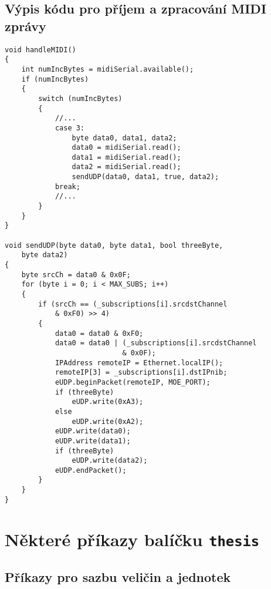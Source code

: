 \section{Výpis kódu pro příjem a zpracování \acs{MIDI} zprávy}\label{code:handleMIDI}
\begin{lstlisting}[caption=Výpis kódu pro příjem a zpracování MIDI zprávy]
void handleMIDI()
{
	int numIncBytes = midiSerial.available();
	if (numIncBytes) 
	{
		switch (numIncBytes)
		{
			//...
			case 3:
				byte data0, data1, data2;
				data0 = midiSerial.read();
				data1 = midiSerial.read();
				data2 = midiSerial.read();
				sendUDP(data0, data1, true, data2);
			break;
			//...
		}
	}
}
	
void sendUDP(byte data0, byte data1, bool threeByte, 
	byte data2)
{
	byte srcCh = data0 & 0x0F;
	for (byte i = 0; i < MAX_SUBS; i++)
	{
		if (srcCh == (_subscriptions[i].srcdstChannel 
			& 0xF0) >> 4)
		{
			data0 = data0 & 0xF0;
			data0 = data0 | (_subscriptions[i].srcdstChannel 
							& 0x0F);
			IPAddress remoteIP = Ethernet.localIP();
			remoteIP[3] = _subscriptions[i].dstIPnib;
			eUDP.beginPacket(remoteIP, MOE_PORT);
			if (threeByte)
				eUDP.write(0xA3);
			else
				eUDP.write(0xA2);
			eUDP.write(data0);
			eUDP.write(data1);
			if (threeByte)
				eUDP.write(data2);
			eUDP.endPacket();
		}
	}
}
\end{lstlisting}






\chapter{Některé příkazy balíčku \texttt{thesis}}

\section{Příkazy pro sazbu veličin a jednotek}

